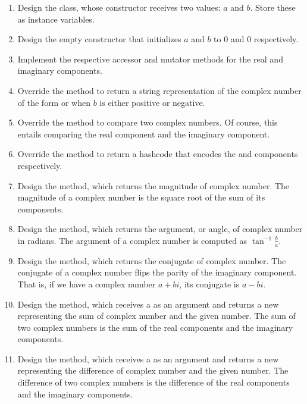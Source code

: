 \begin{enumerate}[label=(\alph*)]
    \item Design the  class, whose constructor receives two  values: $a$ and $b$. Store these as instance variables.
    \item Design the empty constructor that initializes $a$ and $b$ to $0$ and $0$ respectively. 
    \item Implement the respective accessor and mutator methods for the real and imaginary components.
    \item Override the  method to return a string representation of the complex number of the form  or  when $b$ is either positive or negative. 
    \item Override the  method to compare two complex numbers. Of course, this entails comparing the real component and the imaginary component.
    \item Override the  method to return a hashcode that encodes the  and  components respectively.
    \item Design the  method, which returns the magnitude of  complex number. The magnitude of a complex number is the square root of the sum of its components.
    \item Design the  method, which returns the argument, or angle, of  complex number in radians. The argument of a complex number is computed as $\tan^{-1}{\frac{b}{a}}$.
    \item Design the  method, which returns the conjugate of  complex number. The conjugate of a complex number flips the parity of the imaginary component. That is, if we have a complex number $a + bi$, its conjugate is $a - bi$.
    \item Design the  method, which receives a  as an argument and returns a new  representing the sum of  complex number and the given number. The sum of two complex numbers is the sum of the real components and the imaginary components.
    \item Design the  method, which receives a  as an argument and returns a new  representing the difference of  complex number and the given number. The difference of two complex numbers is the difference of the real components and the imaginary components.

\end{enumerate}
